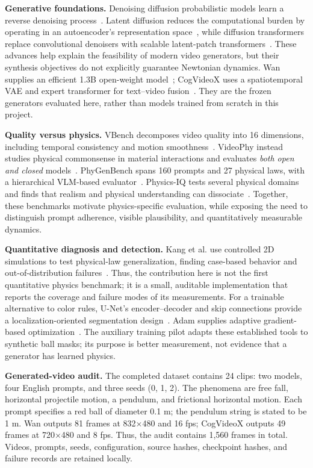 \documentclass[11pt,a4paper]{article}
\newcommand{\sect}[2]{\vspace{4pt}{\large\bfseries\color{navy}#1. #2}\par\vspace{2pt}}
\begin{document}
\sect{2}{Related Work}
\textbf{Generative foundations.} Denoising diffusion probabilistic models
learn a reverse denoising process~\cite{Ho2020denoising}. Latent diffusion reduces
the computational burden by operating in an autoencoder's representation
space~\cite{Rombach2021high}, while diffusion transformers replace convolutional
denoisers with scalable latent-patch transformers~\cite{Peebles2022scalable}.
These advances help explain the feasibility of modern video generators, but
their synthesis objectives do not explicitly guarantee Newtonian dynamics.
Wan supplies an efficient 1.3B open-weight model~\cite{Wan2025open}; CogVideoX
uses a spatiotemporal VAE and expert transformer for text--video
fusion~\cite{Yang2024cogvideox}. They are the frozen generators evaluated here,
rather than models trained from scratch in this project.

\textbf{Quality versus physics.} VBench decomposes video quality into 16
dimensions, including temporal consistency and motion
smoothness~\cite{Huang2023vbench}. VideoPhy instead studies physical commonsense
in material interactions and evaluates \emph{both open and closed}
models~\cite{Bansal2024videophy}. PhyGenBench spans 160 prompts and 27 physical
laws, with a hierarchical VLM-based evaluator~\cite{Meng2024towards}. Physics-IQ
tests several physical domains and finds that realism and physical understanding
can dissociate~\cite{Motamed2025generative}. Together, these benchmarks motivate
physics-specific evaluation, while exposing the need to distinguish prompt
adherence, visible plausibility, and quantitatively measurable dynamics.

\textbf{Quantitative diagnosis and detection.} Kang et al. use controlled 2D
simulations to test physical-law generalization, finding case-based behavior and
out-of-distribution failures~\cite{Kang2024video}. Thus, the contribution here is
not the first quantitative physics benchmark; it is a small, auditable
implementation that reports the coverage and failure modes of its measurements.
For a trainable alternative to color rules, U-Net's encoder--decoder and skip
connections provide a localization-oriented segmentation
design~\cite{Ronneberger2015convolutional}. Adam supplies adaptive gradient-based
optimization~\cite{Kingma2014adam}. The auxiliary training pilot adapts these
established tools to synthetic ball masks; its purpose is better measurement,
not evidence that a generator has learned physics.

\newpage
\sect{3}{Data}
\textbf{Generated-video audit.} The completed dataset contains 24 clips:
two models, four English prompts, and three seeds (0, 1, 2). The phenomena are
free fall, horizontal projectile motion, a pendulum, and frictional horizontal
motion. Each prompt specifies a red ball of diameter 0.1 m; the pendulum string
is stated to be 1 m. Wan outputs 81 frames at 832$\times$480 and 16 fps;
CogVideoX outputs 49 frames at 720$\times$480 and 8 fps. Thus, the audit contains
1,560 frames in total. Videos, prompts, seeds, configuration, source hashes,
checkpoint hashes, and failure records are retained locally.
\end{document}

